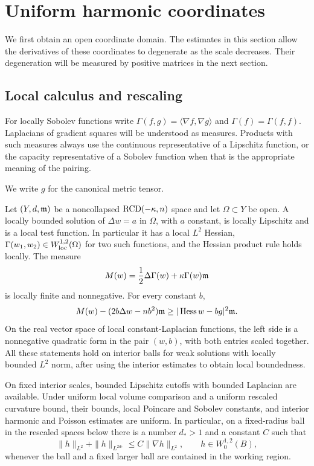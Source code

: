 \section{Uniform harmonic coordinates}
\label{co:section}

We first obtain an open coordinate domain.  The estimates in this
section allow the derivatives of these coordinates to degenerate as
the scale decreases.  Their degeneration will be measured by positive
matrices in the next section.

\subsection{Local calculus and rescaling}

For locally Sobolev functions write
\(\Gamma(f,g)=\langle\nabla f,\nabla g\rangle\) and
\(\Gamma(f)=\Gamma(f,f)\).  Laplacians of gradient squares will be
understood as measures.  Products with such measures always use the
continuous representative of a Lipschitz function, or the capacity
representative of a Sobolev function when that is the appropriate
meaning of the pairing.

We write \(g\) for the canonical metric tensor.

\begin{lemma}\label{co:local-calculus}
Let \((Y,d,\mathfrak m)\) be a noncollapsed \(\mathrm{RCD}(-\kappa,n)\) space and let
\(\Omega\subset Y\) be open.  A locally bounded solution of
\(\Delta w=a\) in \(\Omega\), with \(a\) constant, is locally Lipschitz
and is a local test function.  In particular it has a local
\(L^2\) Hessian, \(\Gamma(w_1,w_2)\in W^{1,2}_{\rm loc}(\Omega)\)
for two such functions, and the Hessian product rule holds locally.
The measure
\begin{equation}\label{co:M-definition}
 M(w)=\frac12\Delta\Gamma(w)+\kappa\Gamma(w)\mathfrak m
\end{equation}
is locally finite and nonnegative.  For every constant \(b\),
\begin{equation}\label{co:shifted-bochner}
 M(w)-(2b\Delta w-nb^2)\mathfrak m
 \ge |\operatorname{Hess} w-bg|^2\mathfrak m.
\end{equation}
On the real vector space of local constant-Laplacian functions,
the left side is a nonnegative quadratic form in the pair
\((w,b)\), with both entries scaled together.
All these statements hold on interior balls for weak solutions with
locally bounded \(L^2\) norm, after using the interior estimates to
obtain local boundedness.

On fixed interior scales, bounded Lipschitz cutoffs with bounded
Laplacian are available.  Under uniform local volume comparison and
a uniform rescaled curvature bound, their bounds, local Poincare
and Sobolev constants, and interior harmonic and Poisson estimates
are uniform.  In particular, on a fixed-radius ball in the rescaled
spaces below there is a number \(d_*>1\) and a constant \(C\) such
that
\begin{equation}\label{co:dirichlet-sobolev}
 \|h\|_{L^2}+\|h\|_{L^{2d_*}}
 \le C\|\nabla h\|_{L^2},\qquad h\in W^{1,2}_0(B),
\end{equation}
whenever the ball and a fixed larger ball are contained in the
working region.
\end{lemma}

